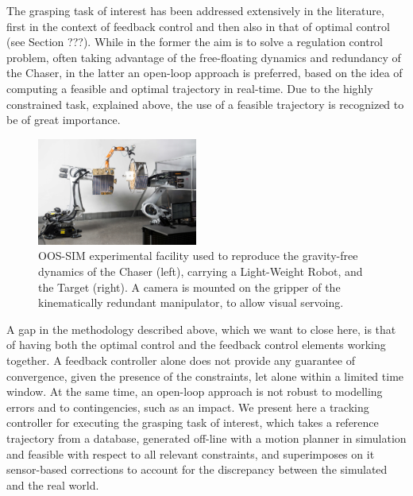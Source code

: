 The grasping task of interest has been addressed extensively in the literature, first in the context of feedback control and then also in that of optimal control (see Section ???). While in the former the aim is to solve a regulation control problem, often taking advantage of the free-floating dynamics and redundancy of the Chaser, in the latter an open-loop approach is preferred, based on the idea of computing a feasible and optimal trajectory in real-time. Due to the highly constrained task, explained above, the use of a feasible trajectory is recognized to be of great importance.
\begin{figure}[t!]
\centering\includegraphics[angle=0,width=0.47\textwidth]{./figures/160914_0226_a_dlr_robotics_bearbeitet_small.jpg}
\caption{OOS-SIM experimental facility used to reproduce the gravity-free dynamics of the Chaser (left), carrying a Light-Weight Robot, and the Target (right). A camera is mounted on the gripper of the kinematically redundant manipulator, to allow visual servoing.}
\label{fig:facility}
\end{figure}

A gap in the methodology described above, which we want to close here, is that of having both the optimal control and the feedback control elements working together. A feedback controller alone does not provide any guarantee of convergence, given the presence of the constraints, let alone within a limited time window. At the same time, an open-loop approach is not robust to modelling errors and to contingencies, such as an impact. We present here a tracking controller for executing the grasping task of interest, which takes a reference trajectory from a database, generated off-line with a motion planner in simulation and feasible with respect to all relevant constraints, and superimposes on it sensor-based corrections to account for the discrepancy between the simulated and the real world.


